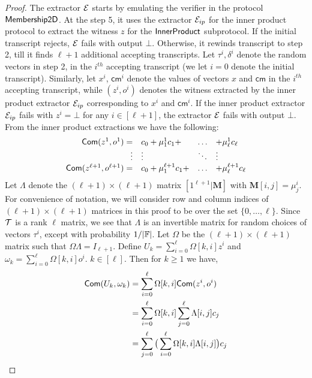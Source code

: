 \begin{proof}
The extractor $\mathcal{E}$ starts by emulating the verifier in the protocol
$\mathsf{Membership2D}$. At the step 5, it uses the extractor $\mathcal{E}_{ip}$ for the
inner product protocol to extract the witness $z$ for the $\mathsf{InnerProduct}$
subprotocol. If the initial transcript rejects, $\mathcal{E}$ fails with output
$\bot$. Otherwise, it rewinds transcript to step 2, till it finds $\ell+1$
additional accepting transcripts. Let $\tau^i,\delta^i$ denote the random
vectors in step 2, in the $i^{th}$ accepting transcript (we let $i=0$ denote the
initial transcript). Similarly, let $x^i$, $\mathsf{cm}^i$ denote the values of
vectors $x$ and $\mathsf{cm}$ in the $i^{th}$ accepting transcript, while $(z^i,o^i)$
denotes the witness extracted by the inner product extractor $\mathcal{E}_{ip}$
corresponding to $x^i$ and $\mathsf{cm}^i$. If the inner product extractor
$\mathcal{E}_{ip}$ fails with $z^i=\bot$ for any $i\in [\ell+1]$, the extractor $\mathcal{E}$
fails with output $\bot$. From the inner product extractions we have the
following:
\begin{align*}
\begin{array}{rlll}
\mathsf{Com}(z^1,o^1)=& c_0 + \mu^1_1c_1+ & \hdots & +\mu^1_{\ell}c_{\ell} \\
\vdots & \vdots & \ddots & \vdots \\
\mathsf{Com}(z^{\ell+1},o^{\ell+1})=& c_0 + \mu^{\ell+1}_1c_1+ & \hdots & +\mu^{\ell+1}_{\ell}c_{\ell} 
\end{array}
\end{align*}
Let $\Lambda$ denote the $(\ell+1)\times (\ell+1)$ matrix $[1^{\ell+1}|\mathbf{M}]$ with $\mathbf{M}[i,j]=\mu^i_j$. For convenience of notation, we will consider row and column indices of $(\ell+1)\times (\ell+1)$ matrices in this proof to be over the set $\{0,\ldots,\ell\}$. 
Since $\mathcal{T}$ is a rank $\ell$ matrix, we see that $\Lambda$ is an invertible
matrix for random choices of vectors $\tau^i$, except with probability
$1/|\mathbb{F}|$. Let $\Omega$ be the $(\ell+1)\times (\ell+1)$ matrix such that
$\Omega\Lambda=I_{\ell+1}$. Define $U_k = \sum_{i=0}^{\ell}\Omega[k,i]z^i$ and $\omega_k=\sum_{i=0}^{\ell}\Omega[k,i]o^i$. 
$k\in [\ell]$. Then for $k\geq 1$ we have,
\begin{align*}
\comm(U_k,\omega_k) &= \sum_{i=0}^{\ell}\Omega[k,i]\comm(z^i,o^i)  \\
	&= \sum_{i=0}^{\ell}\Omega[k,i]\sum_{j=0}^{\ell}\Lambda[i,j]c_j \\
	&= \sum_{j=0}^{\ell}\big(\sum_{i=0}^{\ell}\Omega[k,i]\Lambda[i,j]\big)c_j
\\

\end{align*}
\end{proof}
